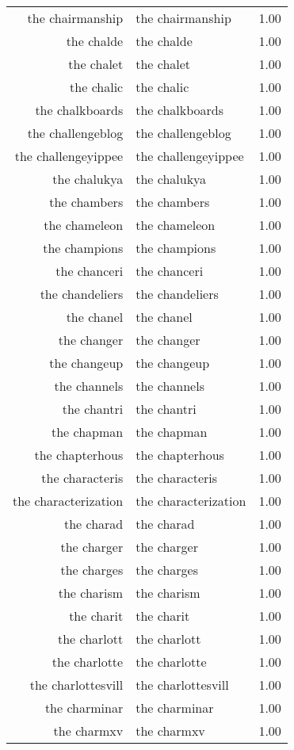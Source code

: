 \begin{table}[ht]
\begin{tabular}{rlr}
  the chairmanship & the chairmanship & 1.00 \\ 
  the chalde & the chalde & 1.00 \\ 
  the chalet & the chalet & 1.00 \\ 
  the chalic & the chalic & 1.00 \\ 
  the chalkboards & the chalkboards & 1.00 \\ 
  the challengeblog & the challengeblog & 1.00 \\ 
  the challengeyippee & the challengeyippee & 1.00 \\ 
  the chalukya & the chalukya & 1.00 \\ 
  the chambers & the chambers & 1.00 \\ 
  the chameleon & the chameleon & 1.00 \\ 
  the champions & the champions & 1.00 \\ 
  the chanceri & the chanceri & 1.00 \\ 
  the chandeliers & the chandeliers & 1.00 \\ 
  the chanel & the chanel & 1.00 \\ 
  the changer & the changer & 1.00 \\ 
  the changeup & the changeup & 1.00 \\ 
  the channels & the channels & 1.00 \\ 
  the chantri & the chantri & 1.00 \\ 
  the chapman & the chapman & 1.00 \\ 
  the chapterhous & the chapterhous & 1.00 \\ 
  the characteris & the characteris & 1.00 \\ 
  the characterization & the characterization & 1.00 \\ 
  the charad & the charad & 1.00 \\ 
  the charger & the charger & 1.00 \\ 
  the charges & the charges & 1.00 \\ 
  the charism & the charism & 1.00 \\ 
  the charit & the charit & 1.00 \\ 
  the charlott & the charlott & 1.00 \\ 
  the charlotte & the charlotte & 1.00 \\ 
  the charlottesvill & the charlottesvill & 1.00 \\ 
  the charminar & the charminar & 1.00 \\ 
  the charmxv & the charmxv & 1.00 \\ 

\end{tabular}
\end{table}
